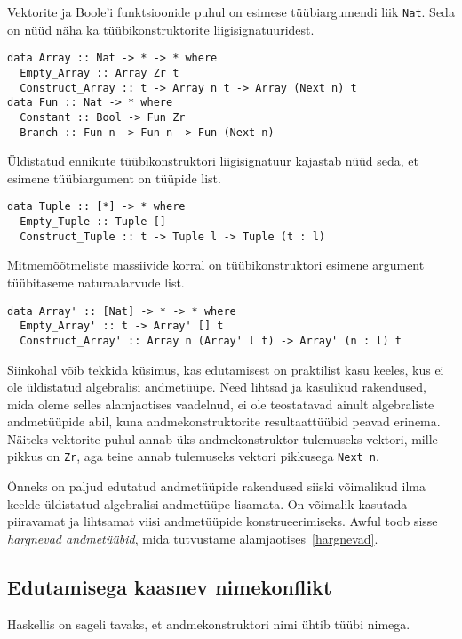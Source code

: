 \documentclass[12pt]{article}
\begin{document}
        Vektorite ja Boole'i funktsioonide puhul on esimese tüübiargumendi liik \verb!Nat!. Seda on nüüd näha ka tüübikonstruktorite liigisignatuuridest.

        \begin{verbatim}data Array :: Nat -> * -> * where
  Empty_Array :: Array Zr t
  Construct_Array :: t -> Array n t -> Array (Next n) t
data Fun :: Nat -> * where
  Constant :: Bool -> Fun Zr
  Branch :: Fun n -> Fun n -> Fun (Next n)\end{verbatim}

        Üldistatud ennikute tüübikonstruktori liigisignatuur kajastab nüüd seda, et esimene tüübiargument on tüüpide list.

        \begin{verbatim}data Tuple :: [*] -> * where
  Empty_Tuple :: Tuple []
  Construct_Tuple :: t -> Tuple l -> Tuple (t : l)\end{verbatim}

        Mitmemõõtmeliste massiivide korral on tüübikonstruktori esimene argument tüübitaseme naturaalarvude list.

        \begin{verbatim}data Array' :: [Nat] -> * -> * where
  Empty_Array' :: t -> Array' [] t
  Construct_Array' :: Array n (Array' l t) -> Array' (n : l) t\end{verbatim}

        Siinkohal võib tekkida küsimus, kas edutamisest on praktilist kasu keeles, kus ei ole üldistatud algebralisi andmetüüpe. Need lihtsad ja kasulikud rakendused, mida oleme selles alamjaotises vaadelnud, ei ole teostatavad ainult algebraliste andmetüüpide abil, kuna andmekonstruktorite resultaattüübid peavad erinema. Näiteks vektorite puhul annab üks andmekonstruktor tulemuseks vektori, mille pikkus on \verb!Zr!, aga teine annab tulemuseks vektori pikkusega \verb!Next n!.

        Õnneks on paljud edutatud andmetüüpide rakendused siiski võimalikud ilma keelde üldistatud algebralisi andmetüüpe lisamata. On võimalik kasutada piiravamat ja lihtsamat viisi andmetüüpide konstrueerimiseks. Awful toob sisse \textit{hargnevad andmetüübid}, mida tutvustame alamjaotises~\ref{hargnevad}.
    \subsection{Edutamisega kaasnev nimekonflikt}
      Haskellis on sageli tavaks, et andmekonstruktori nimi ühtib tüübi nimega.
\end{document}
